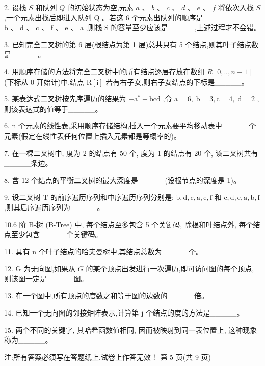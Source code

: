 2. 设栈 \(S\) 和队列 \(Q\) 的初始状态为空,元素 \(a\) 、 \(b\) 、 \(c\) 、 \(d\) 、 \(e\) 、 \(f\) 将依次入栈 \(S\) ,一个元素出栈后即进入队列 \(\mathrm{Q}\) 。若这 6 个元素出队列的顺序是 \(\mathrm{b}\text{ 、 }\mathrm{d}\text{ 、 }\mathrm{c}\text{ 、 }\mathrm{f}\text{ 、 }\mathrm{e}\text{ 、 }\mathrm{a}\) ,则栈 \(\mathrm{S}\) 的容量至少应该是\_\_\_\_\_,上述过程才不会错。

3. 已知完全二叉树的第 6 层(根结点为第 1 层)总共只有 5 个结点,则其叶子结点数是\_\_\_\_\_。

4. 用顺序存储的方法将完全二叉树中的所有结点逐层存放在数组 \(R\left\lbrack  {0,..,n - 1}\right\rbrack\) (下标从 0 开始计)中,结点 \(\mathrm{R}\left\lbrack  \mathrm{i}\right\rbrack\) 若有右子女,则右子女结点的下标是\_\_\_\_\_。

5. 某表达式二叉树按先序遍历的结果为 \(+ {\mathrm{a}}^{ * } + \mathrm{{bcd}}\) ,令 \(\mathrm{a} = 6,\mathrm{\;b} = 3,\mathrm{c} = 4,\mathrm{\;d} = 2\) ,则该表达式的值等于\_\_\_\_\_。

6. n 个元素的线性表,采用顺序存储结构,插入一个元素要平均移动表中\_\_\_\_\_个元素(假定在线性表任何位置上插入元素都是等概率的)。

7. 在一棵二叉树中, 度为 2 的结点有 50 个, 度为 1 的结点有 20 个, 该二叉树共有\_\_\_\_\_条边。

8. 含 12 个结点的平衡二叉树的最大深度是\_\_\_\_\_(设根节点的深度是 1)。

9. 设二叉树 \(\mathrm{T}\) 的前序遍历序列和中序遍历序列分别是: \(\mathrm{b},\mathrm{d},\mathrm{c},\mathrm{a},\mathrm{e},\mathrm{f}\) 和 \(\mathrm{c},\mathrm{d},\mathrm{e},\mathrm{a},\mathrm{b},\mathrm{f}\) ,则其后序遍历序列为\_\_\_\_\_。

10.6 阶 B-树 (B-Tree) 中, 每个结点至多包含 5 个关键码, 除根和叶结点外, 每个结点至少包含\_\_\_\_\_个关键码。

11. 具有 n 个叶子结点的哈夫曼树中,其结点总数为\_\_\_\_\_个。

12. G 为无向图,如果从 \(G\) 的某个顶点出发进行一次遍历,即可访问图的每个顶点,则该图一定是\_\_\_\_\_图。

13. 在一个图中,所有顶点的度数之和等于图的边数的\_\_\_\_\_倍。

14. 已知一个无向图的邻接矩阵表示,计算第 j 个结点的度的方法是\_\_\_\_\_。

15. 两个不同的关键字, 其哈希函数值相同, 因而被映射到同一表位置上, 这种现象称为\_\_\_\_\_。

\vspace{14em}

注:所有答案必须写在答题纸上,试卷上作答无效！ 第 5 页(共 9 页)

